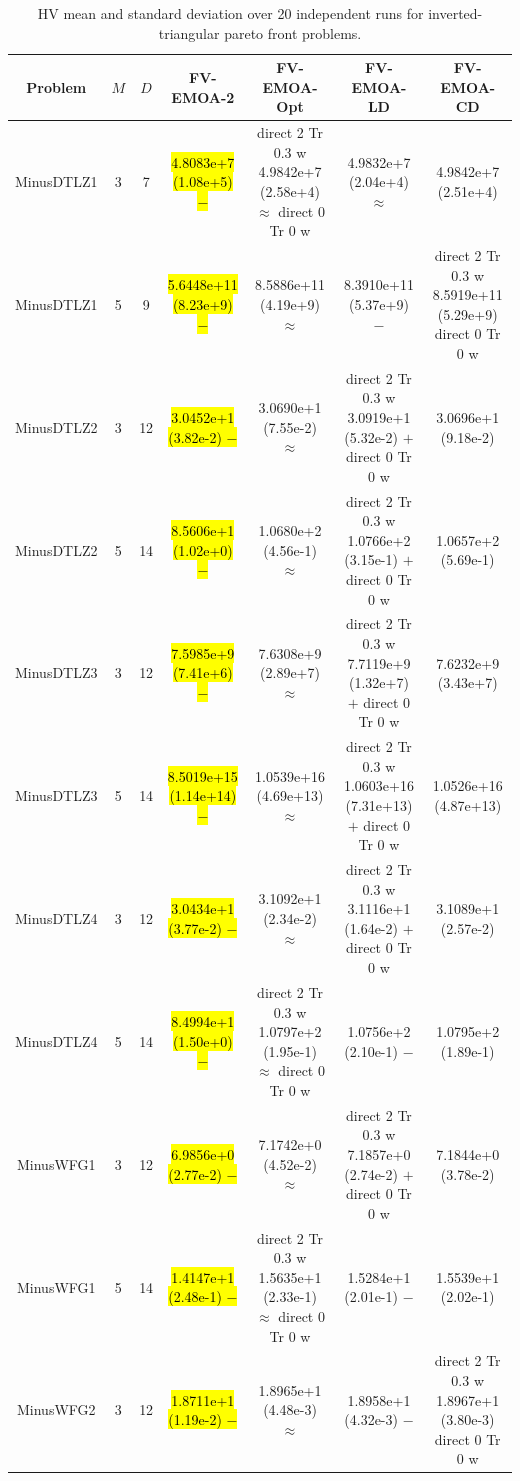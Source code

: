 \documentclass[conference]{IEEEtran}
\newcommand{\semitextbf}[1]{%
	\pdfliteral direct {2 Tr 0.3 w} %
	#1%
	\pdfliteral direct {0 Tr 0 w}%
}
\begin{document}
\begin{table}[!t]\footnotesize
    \caption{HV mean and standard deviation over 20 independent runs for inverted-triangular pareto front problems.} %
    \label{table_FVEMOA_itri}
    \centering
    \begin{tabular}{ccccccc}
        \toprule
        Problem&$M$&$D$&FV-EMOA-2&FV-EMOA-Opt&FV-EMOA-LD&FV-EMOA-CD\\ 
        \midrule
        \multirow{1}{*}{MinusDTLZ1}&3&7&\hl{4.8083e+7 (1.08e+5) $-$}&\semitextbf{4.9842e+7 (2.58e+4) $\approx$}&4.9832e+7 (2.04e+4) $\approx$&4.9842e+7 (2.51e+4)\\
        \multirow{1}{*}{MinusDTLZ1}&5&9&\hl{5.6448e+11 (8.23e+9) $-$}&8.5886e+11 (4.19e+9) $\approx$&8.3910e+11 (5.37e+9) $-$&\semitextbf{8.5919e+11 (5.29e+9)}\\
        \multirow{1}{*}{MinusDTLZ2}&3&12&\hl{3.0452e+1 (3.82e-2) $-$}&3.0690e+1 (7.55e-2) $\approx$&\semitextbf{3.0919e+1 (5.32e-2) $+$}&3.0696e+1 (9.18e-2)\\
        \multirow{1}{*}{MinusDTLZ2}&5&14&\hl{8.5606e+1 (1.02e+0) $-$}&1.0680e+2 (4.56e-1) $\approx$&\semitextbf{1.0766e+2 (3.15e-1) $+$}&1.0657e+2 (5.69e-1)\\
        \multirow{1}{*}{MinusDTLZ3}&3&12&\hl{7.5985e+9 (7.41e+6) $-$}&7.6308e+9 (2.89e+7) $\approx$&\semitextbf{7.7119e+9 (1.32e+7) $+$}&7.6232e+9 (3.43e+7)\\
        \multirow{1}{*}{MinusDTLZ3}&5&14&\hl{8.5019e+15 (1.14e+14) $-$}&1.0539e+16 (4.69e+13) $\approx$&\semitextbf{1.0603e+16 (7.31e+13) $+$}&1.0526e+16 (4.87e+13)\\
        \multirow{1}{*}{MinusDTLZ4}&3&12&\hl{3.0434e+1 (3.77e-2) $-$}&3.1092e+1 (2.34e-2) $\approx$&\semitextbf{3.1116e+1 (1.64e-2) $+$}&3.1089e+1 (2.57e-2)\\
        \multirow{1}{*}{MinusDTLZ4}&5&14&\hl{8.4994e+1 (1.50e+0) $-$}&\semitextbf{1.0797e+2 (1.95e-1) $\approx$}&1.0756e+2 (2.10e-1) $-$&1.0795e+2 (1.89e-1)\\      
        \hline
        \multirow{1}{*}{MinusWFG1}&3&12&\hl{6.9856e+0 (2.77e-2) $-$}&7.1742e+0 (4.52e-2) $\approx$&\semitextbf{7.1857e+0 (2.74e-2) $+$}&7.1844e+0 (3.78e-2)\\
        \multirow{1}{*}{MinusWFG1}&5&14&\hl{1.4147e+1 (2.48e-1) $-$}&\semitextbf{1.5635e+1 (2.33e-1) $\approx$}&1.5284e+1 (2.01e-1) $-$&1.5539e+1 (2.02e-1)\\
        \multirow{1}{*}{MinusWFG2}&3&12&\hl{1.8711e+1 (1.19e-2) $-$}&1.8965e+1 (4.48e-3) $\approx$&1.8958e+1 (4.32e-3) $-$&\semitextbf{1.8967e+1 (3.80e-3)}\\

\end{tabular}
\end{table}
\end{document}

